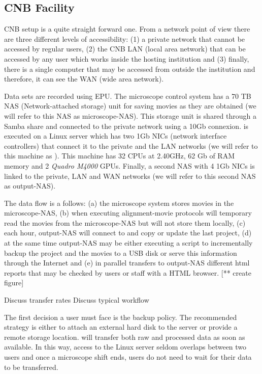 \subsection{CNB Facility}

CNB setup is a quite straight forward one. From a network point of view there are three different levels of accessibility: (1) a private network that cannot be accessed by regular users, (2) the CNB LAN (local area network)  that can be accessed by any user which works inside the hosting  institution and (3) finally, there is a single computer that may be accessed from outside the institution and therefore, it can see the WAN (wide area network).

Data sets are recorded using EPU. The microscope control system has a 70 TB NAS (Network-attached storage) unit for saving movies as they are obtained (we will refer to this NAS as microscope-NAS). This storage unit is shared through a Samba share and connected to the private network using a 10Gb connexion. \scipion is executed on a Linux server which has two 1Gb NICs (network interface controllers) that connect it to the private and the LAN networks (we will refer to this machine as \scipionbox). This machine has 32 CPUs at 2.40GHz, 62 Gb of RAM memory and 2 \textit{Quadro M4000} GPUs. Finally, a second NAS with 4 1Gb NICs is linked to the private, LAN and WAN networks (we will refer to this second NAS as output-NAS).

The data flow is a follows: (a) the microscope system stores movies in the microscope-NAS, (b) when executing alignment-movie protocols \scipionbox will temporary read the movies from 
the microscope-NAS but will not store them locally, (c) each hour, output-NAS will connect to \scipionbox and copy or update the last \scipion project, (d) at the same time output-NAS may be either executing a script to incrementally backup the \scipion project and the movies to a USB disk or serve this information through the Internet and (e) in parallel \scipionbox transfers to  output-NAS different html reports that may be checked by users or staff with a HTML browser.
[** create figure]

Discuss transfer rates
Discuss typical workflow

The first decision a user must face is the backup policy. The recommended strategy is either to attach an external hard disk to the server or provide a remote storage location. \scipionbox will transfer both raw and processed data as soon as available. In this way, access to the Linux server seldom overlaps between two users and once a microscope shift ends, users do not need to wait for their data to be transferred. 

